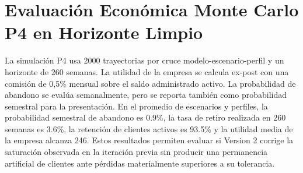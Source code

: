 \documentclass[11pt]{article}
\begin{document}
\section{Evaluación Económica Monte Carlo P4 en Horizonte Limpio}
La simulación P4 usa 2000 trayectorias por cruce modelo-escenario-perfil y un horizonte de 260 semanas. La utilidad de la empresa se calcula ex-post con una comisión de 0,5\% mensual sobre el saldo administrado activo. La probabilidad de abandono se evalúa semanalmente, pero se reporta también como probabilidad semestral para la presentación.
En el promedio de escenarios y perfiles, la probabilidad semestral de abandono es 0.9\%, la tasa de retiro realizada en 260 semanas es 3.6\%, la retención de clientes activos es 93.5\% y la utilidad media de la empresa alcanza 246. Estos resultados permiten evaluar si Version 2 corrige la saturación observada en la iteración previa sin producir una permanencia artificial de clientes ante pérdidas materialmente superiores a su tolerancia.
\begin{table}[H]
\centering
{}
\caption{Resultados P4 y comportamiento de clientes para Version 2.}
\label{tab:version_2:p4}
\end{table}
\end{document}
